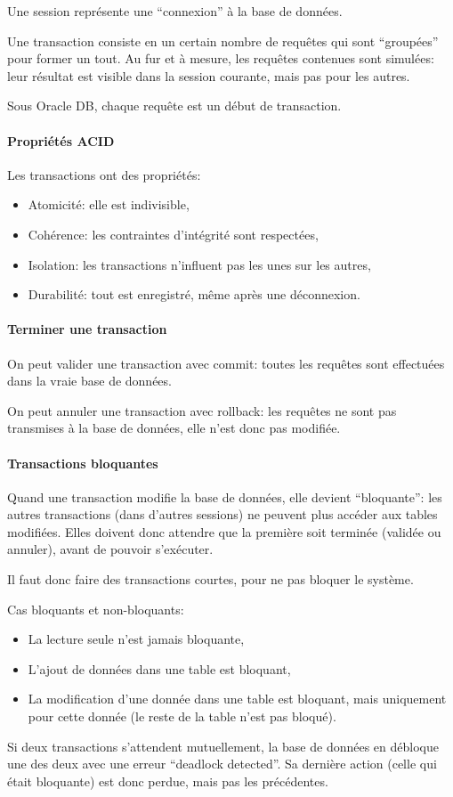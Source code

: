 \documentclass[10pt,a4paper,french]{article}
\begin{document}
Une session représente une ``connexion'' à la base de données.

Une transaction consiste en un certain nombre de requêtes qui sont ``groupées'' pour former un tout. Au fur et à mesure, les requêtes contenues sont simulées: leur résultat est visible dans la session courante, mais pas pour les autres.

Sous Oracle DB, chaque requête est un début de transaction.

\paragraph{Propriétés ACID}
Les transactions ont des propriétés:
\begin{itemize}
\item Atomicité: elle est indivisible,
\item Cohérence: les contraintes d'intégrité sont respectées,
\item Isolation: les transactions n'influent pas les unes sur les autres,
\item Durabilité: tout est enregistré, même après une déconnexion.
\end{itemize}

\paragraph{Terminer une transaction}
On peut valider une transaction avec \gls{commit}: toutes les requêtes sont effectuées dans la vraie base de données.

On peut annuler une transaction avec \gls{rollback}: les requêtes ne sont pas transmises à la base de données, elle n'est donc pas modifiée.

\paragraph{Transactions bloquantes}
Quand une transaction modifie la base de données, elle devient ``bloquante'': les autres transactions (dans d'autres sessions) ne peuvent plus accéder aux tables modifiées. Elles doivent donc attendre que la première soit terminée (validée ou annuler), avant de pouvoir s'exécuter.

Il faut donc faire des transactions courtes, pour ne pas bloquer le système.

Cas bloquants et non-bloquants:
\begin{itemize}
\item La lecture seule n'est jamais bloquante,
\item L'ajout de données dans une table est bloquant, \hfill {}
\item La modification d'une donnée dans une table est bloquant, mais uniquement pour cette donnée (le reste de la table n'est pas bloqué). \hfill {}
\end{itemize}
Si deux transactions s'attendent mutuellement, la base de données en débloque une des deux avec une erreur ``deadlock detected''. Sa dernière action (celle qui était bloquante) est donc perdue, mais pas les précédentes.

\appendix %

\printglossaries
\end{document}
